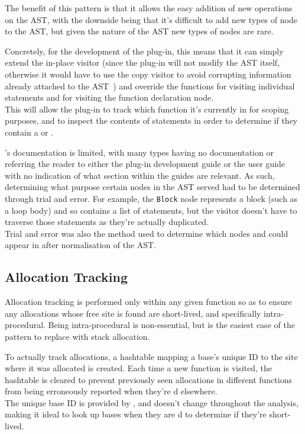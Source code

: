 The benefit of this pattern is that it allows the easy addition of new operations on the AST, with the downside being that it's difficult to add new types of node to the AST, but given the nature of the AST new types of nodes are rare.

Concretely, for the development of the plug-in, this means that it can simply extend the in-place visitor (since the plug-in will not modify the AST itself, otherwise it would have to use the copy visitor to avoid corrupting information already attached to the AST~\cite{framaplug}) and override the functions for visiting individual statements and for visiting the function declaration node. \\
This will allow the plug-in to track which function it's currently in for scoping purposes, and to inspect the contents of statements in order to determine if they contain a \malloc{} or \free{}.

's documentation is limited, with many types having no documentation or referring the reader to either the plug-in development guide or the user guide with no indication of what section within the guides are relevant. As such, determining what purpose certain nodes in the AST served had to be determined through trial and error. For example, the \texttt{Block} node represents a block (such as a loop body) and so contains a list of statements, but the visitor doesn't have to traverse those statements as they're actually duplicated.\\
Trial and error was also the method used to determine which nodes \malloc{} and \free{} could appear in after normalisation of the AST\@.

\subsection{Allocation Tracking}\label{alloctrack}

Allocation tracking is performed only within any given function so as to ensure any allocations whose free site is found are short-lived, and specifically intra-procedural. Being intra-procedural is non-essential, but is the easiest case of the pattern to replace with stack allocation.

To actually track allocations, a hashtable mapping a base's unique ID to the site where it was allocated is created. Each time a new function is visited, the hashtable is cleared to prevent previously seen allocations in different functions from being erroneously reported when they're \free{}d elsewhere.\\
The unique base ID is provided by , and doesn't change throughout the analysis, making it ideal to look up bases when they are \free{}d to determine if they're short-lived.

